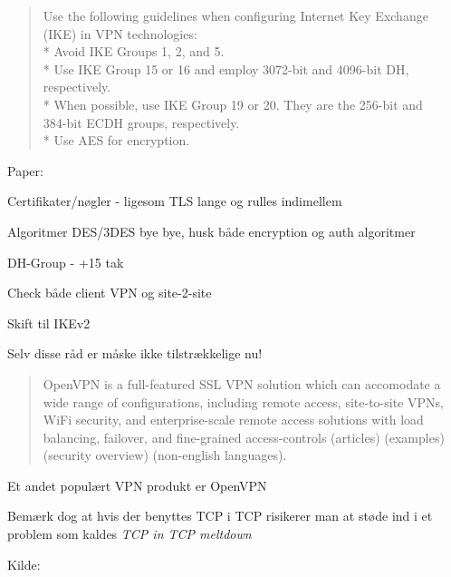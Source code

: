 \documentclass[Screen16to9,17pt]{foils}
\begin{document}
\begin{list2}
  \item {}
\end{list2}




\begin{quote}\small
  Use the following guidelines when configuring Internet Key Exchange (IKE) in VPN technologies:\\
* Avoid IKE Groups 1, 2, and 5.\\
* Use IKE Group 15 or 16 and employ 3072-bit and 4096-bit DH, respectively.\\
* When possible, use IKE Group 19 or 20. They are the 256-bit and \\
384-bit ECDH groups, respectively.\\
* Use AES for encryption.
\end{quote}
Paper:
{\small {}}

\begin{list2}
\item Certifikater/nøgler - ligesom TLS lange og rulles indimellem
\item Algoritmer DES/3DES bye bye, husk både encryption og auth algoritmer
\item DH-Group - +15 tak
\item Check både client VPN og site-2-site
\item Skift til IKEv2
\item Selv disse råd er måske ikke tilstrækkelige nu!
\end{list2}



\begin{quote}
OpenVPN is a full-featured SSL VPN solution which can accomodate a
wide range of configurations, including remote access, site-to-site
VPNs, WiFi security, and enterprise-scale remote access solutions with
load balancing, failover, and fine-grained access-controls (articles)
(examples) (security overview) (non-english languages).
\end{quote}

\begin{list1}
\item Et andet populært VPN produkt er OpenVPN
\item Bemærk dog at hvis der benyttes TCP i TCP risikerer man at støde ind i
et problem som kaldes \emph{TCP in TCP meltdown}
\item Kilde: 
\end{list1}
\end{document}
